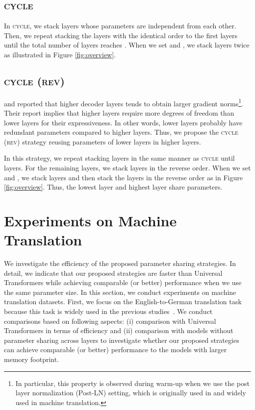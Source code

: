 \documentclass[11pt]{article}
\begin{document}
\subsection{\textsc{cycle}}
In \textsc{cycle}, we stack  layers whose parameters are independent from each other.
Then, we repeat stacking the  layers with the identical order to the first  layers until the total number of layers reaches .
When we set  and , we stack  layers twice as illustrated in Figure \ref{fig:overview}.


\subsection{\textsc{cycle (rev)}}
\citet{liu-etal-2020-understanding} and \citet{takase:2022:b2t} reported that higher decoder layers tends to obtain larger gradient norms\footnote{In particular, this property is observed during warm-up when we use the post layer normalization (Post-LN) setting, which is originally used in  and widely used in machine translation.}.
Their report implies that higher layers require more degrees of freedom than lower layers for their expressiveness.
In other words, lower layers probably have redundant parameters compared to higher layers.
Thus, we propose the \textsc{cycle (rev)} strategy reusing parameters of lower layers in higher layers.


In this strategy, we repeat stacking  layers in the same manner as \textsc{cycle} until  layers.
For the remaining layers, we stack  layers in the reverse order.
When we set  and , we stack  layers and then stack the  layers in the reverse order as in Figure \ref{fig:overview}.
Thus, the lowest layer and highest layer share parameters.



\section{Experiments on Machine Translation}
\label{sec:exp_mt}


We investigate the efficiency of the proposed parameter sharing strategies. 
In detail, we indicate that our proposed strategies are faster than Universal Transformers while achieving comparable (or better) performance when we use the same parameter size.
In this section, we conduct experiments on machine translation datasets.
First, we focus on the English-to-German translation task because this task is widely used in the previous studies~\cite{NIPS2017_7181,ott-etal-2018-scaling,dehghani2019,kiyono-etal-2020-tohoku}.
We conduct comparisons based on following aspects: (i) comparison with Universal Transformers in terms of efficiency and 
(ii) comparison with models without parameter sharing across layers to investigate whether our proposed strategies can achieve comparable (or better) performance to the models with larger memory footprint.
\end{document}
